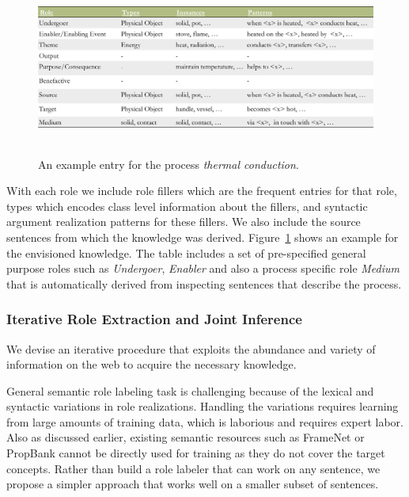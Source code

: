 \begin{figure}[hb]
	\begin{center}
	\includegraphics[width=6.26in,height=2.26in]{figures/processkb-snippet.pdf} 	
	\caption{\label{fig:kbsnippet} 
	{An example entry for the process {\em thermal conduction}.}
	}
	\end{center}
\end{figure}
With each role we include role fillers which are the frequent entries for that role, types which encodes class level information about the fillers, and syntactic argument realization patterns for these fillers.
We also include the source sentences from which the knowledge was derived.
Figure~\ref{fig:kbsnippet} shows an example for the envisioned knowledge. 
The table includes a set of pre-specified general purpose roles such as {\em Undergoer}, {\em Enabler} and also a process specific role {\em Medium} that is automatically derived from inspecting sentences that describe the process. 

%
\subsubsection*{Iterative Role Extraction and Joint Inference}

We devise an iterative procedure that exploits the abundance and variety of information on the web to acquire the necessary knowledge.

General semantic role labeling task is challenging because of the lexical and syntactic variations in role realizations. 
Handling the variations requires learning from large amounts of training data, which is laborious and requires expert labor.
Also as discussed earlier, existing semantic resources such as FrameNet or PropBank cannot be directly used for training as they do not cover the target concepts.
Rather than build a role labeler that can work on any sentence, we propose a simpler approach that works well on a smaller subset of sentences.


